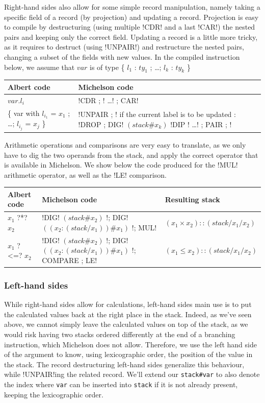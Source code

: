 \documentclass{report}
\begin{document}
Right-hand sides also allow for some simple record manipulation, namely taking a specific field of a record (by projection) and updating a record. Projection is easy to compile by destructuring (using multiple !CDR! and a last !CAR!) the nested pairs and keeping only the correct field. Updating a record is a little more tricky, as it requires to destruct (using !UNPAIR!) and restructure the nested pairs, changing a subset of the fields with new values. In the compiled instruction below, we assume that $var$ is of type \{ $l_1$ : $ty_1$ ; \ldots ; $l_k$ : $ty_k$ \}

{\small
\begin{longtable}{l|p{10cm}}
  Albert code & Michelson code \\
  \hline
  $var.l_i$ & !CDR ; ! \ldots ! ; CAR! \\
  \hline
  \{ var with $l_{i_1}$ = $x_1$ ; \ldots ; $l_{i_j}$ = $x_j$ \} & !UNPAIR ; ! \newline
  if the current label is to be updated : !DROP ; DIG! $(stack\#x_k)$ \newline
  !DIP {! \ldots !} ; PAIR ; !
\end{longtable}
}
   
Arithmetic operations and comparisons are very easy to translate, as we only have to dig the two operands from the stack, and apply the correct operator that is available in Michelson. We show below the code produced for the !MUL! arithmetic operator, as well as the !LE! comparison.

{\small
\begin{longtable}{l|p{9.5cm}|l}
  Albert code & Michelson code & Resulting stack\\
  \hline
  $x_1$ ?*? $x_2$ & !DIG! $(stack\#x_2)$ !; DIG! $((x_2:(stack/x_1))\#x_1)$ !; MUL! & $(x_1 \times x_2)::(stack/x_1/x_2)$\\
  \hline
  $x_1$ ?<=? $x_2$ & !DIG! $(stack\#x_2)$ !; DIG! $((x_2:(stack/x_1))\#x_1)$ !; COMPARE ; LE! & $(x_1 \le x_2)::(stack/x_1/x_2)$\\
\end{longtable}
}

\subsubsection{Left-hand sides}

While right-hand sides allow for calculations, left-hand sides main use is to put the calculated values back at the right place in the stack. Indeed, as we've seen above, we cannot simply leave the calculated values on top of the stack, as we would risk having two stacks ordered differently at the end of a branching instruction, which Michelson does not allow. Therefore, we use the left hand side of the argument to know, using lexicographic order, the position of the value in the stack. The record destructuring left-hand sides generalize this behaviour, while !UNPAIR!ing the related record. We'll extend our \texttt{stack\#var} to also denote the index where \texttt{var} can be inserted into \texttt{stack} if it is not already present, keeping the lexicographic order.
\end{document}
